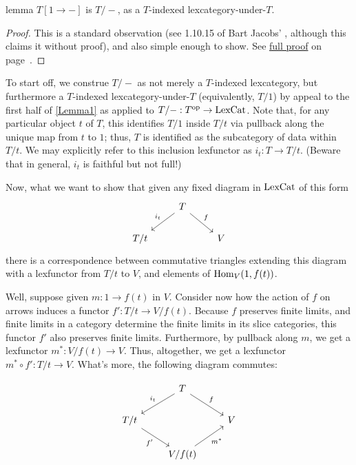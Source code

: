 \documentclass[./main.tex]{subfiles}
\begin{document}
\begin{theoremEnd}[category=IntrospLemmas]{lemma}\label{Lemma2}
$T[1 \to -]$ is $T/-$, as a $T$-indexed lexcategory-under-$T$.
\end{theoremEnd}
\begin{proof}
This is a standard observation (see 1.10.15 of Bart Jacobs' , although this claims it without proof), and also simple enough to show. See \hyperref[proof:prAtEnd\pratendcountercurrent]{full proof} on page~\pageref{proof:prAtEnd\pratendcountercurrent}.
\end{proof}
\begin{proofEnd}
To start off, we construe $T/-$ as not merely a $T$-indexed lexcategory, but furthermore a $T$-indexed lexcategory-under-$T$ (equivalently, $T/1$) by appeal to the first half of \cref{Lemma1} as applied to $T/- : T^{\mathrm{op}} \to \mathrm{LexCat}$. Note that, for any particular object $t$ of $T$, this identifies $T/1$ inside $T/t$ via pullback along the unique map from $t$ to $1$; thus, $T$ is identified as the subcategory of  data within $T/t$. We may explicitly refer to this inclusion lexfunctor as $i_t : T \to T/t$. (Beware that in general, $i_t$ is faithful but not full!)

Now, what we want to show that given any fixed diagram in $\mathrm{LexCat}$ of this form
\[\begin{tikzcd}
	& T \\
	{T/t} && V
	\arrow["{i_t}"', from=1-2, to=2-1]
	\arrow["f", from=1-2, to=2-3]
\end{tikzcd}\]
there is a correspondence between commutative triangles extending this diagram with a lexfunctor from $T/t$ to $V$, and elements of $\operatorname{Hom}_V(1, f(t))$.

Well, suppose given $m : 1 \to f(t)$ in $V$. Consider now how the action of $f$ on arrows induces a functor $f' : T/t \to V/f(t)$. Because $f$ preserves finite limits, and finite limits in a category determine the finite limits in its slice categories, this functor $f'$ also preserves finite limits. Furthermore, by pullback along $m$, we get a lexfunctor $m^* : V/f(t) \to V$. Thus, altogether, we get a lexfunctor $m^* \circ f' : T/t \to V$. What's more, the following diagram commutes:

\[\begin{tikzcd}
	& T \\
	{T/t} && V \\
	& {V/f(t)}
	\arrow["{i_t}"', from=1-2, to=2-1]
	\arrow["f", from=1-2, to=2-3]
	\arrow["{f'}"', from=2-1, to=3-2]
	\arrow["{m^*}"', from=3-2, to=2-3]
\end{tikzcd}\]


\end{proofEnd}
\end{document}
